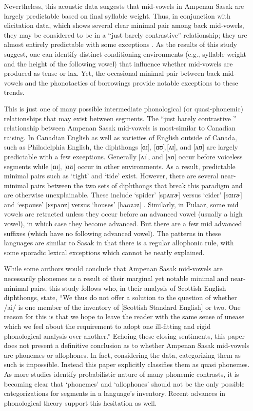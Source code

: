 \documentclass[12pt]{ouparticle}
\begin{document}
Nevertheless, this acoustic data suggests that mid-vowels in Ampenan Sasak are largely predictable based on final syllable weight. Thus, in conjunction with elicitation data, which shows several clear minimal pair among back mid-vowels, they may be considered to be in a ``just barely contrastive'' relationship; they are almost entirely predictable with some exceptions \citep[10]{goldsmith1995}. As the results of this study suggest, one can identify distinct conditioning environments (e.g., syllable weight and the height of the following vowel) that influence whether mid-vowels are produced as tense or lax. Yet, the occasional minimal pair between back mid-vowels and the phonotactics of borrowings provide notable exceptions to these trends. 

This is just one of many possible intermediate phonological (or quasi-phonemic) relationships that may exist between segments. The ``just barely contrastive '' relationship between Ampenan Sasak mid-vowels is most-similar to Canadian raising. In Canadian English as well as varieties of English outside of Canada, such as Philadelphia English, the diphthongs [ɑɪ], [ɑʊ],[ʌɪ], and [ʌʊ] are largely predictable with a few exceptions. Generally [ʌɪ], and [ʌʊ] occur before voiceless segments while [ɑɪ], [ɑʊ] occur in other environments. As a result, predictable minimal pairs such as `tight' and `tide' exist. However, there are several near-minimal pairs between the two sets of diphthongs that break this paradigm and are otherwise unexplainable. These include `spider' [spʌɪɾɚ] versus `cider' [sɑɪɾɚ] and `espouse' [ɛspʌʊz] versus `houses' [haʊzəz] \citep{myers1993}. Similarly, in Pulaar, some mid vowels are retracted unless they occur before an advanced vowel (usually a high vowel), in which case they become advanced. But there are a few mid advanced suffixes (which have no following advanced vowel). The patterns in these languages are similar to Sasak in that there is a regular allophonic rule, with some sporadic lexical exceptions which cannot be neatly explained. 

While some authors would conclude that Ampenan Sasak mid-vowels are necessarily phonemes as a result of their marginal yet notable minimal and near-minimal pairs, this study follows \citet[15]{scobbie2008} who, in their analysis of Scottish English diphthongs, state, ``We thus do not offer a solution to the question of whether /ai/ is one member of the inventory of [Scottish Standard English] or two. One reason for this is that we hope to leave the reader with the same sense of unease which we feel about the requirement to adopt one ill-fitting and rigid phonological analysis over another.” Echoing these closing sentiments, this paper does not present a definitive conclusion as to whether Ampenan Sasak mid-vowels are phonemes or allophones. In fact, considering the data, categorizing them as such is impossible. Instead this paper explicitly classifies them as quasi phonemes. As more studies identify probabilistic nature of many phonemic contrasts, it is becoming clear that `phonemes' and `allophones' should not be the only possible categorizations for segments in a language's inventory. Recent advances in phonological theory support this hesitation as well. 
\end{document}
